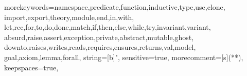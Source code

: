 
\newcommand{\todo}[1]{{\Huge\bfseries TODO: #1}}

\newcommand{\why}{\textsf{Why3}\xspace}
\newcommand{\whyml}{\textsf{WhyML}\xspace}
\newcommand{\eg}{\emph{e.g.}\xspace}
\newcommand{\ie}{\emph{i.e.}\xspace}

\newcommand{\emptyitem}{\begin{latexonly}~\end{latexonly}}

\newcommand{\keyword}[1]{\texttt{#1}}
\newcommand{\indextt}[1]{\index{#1@\protect\keyword{#1}}}
\newcommand{\indexttbs}[1]{\index{#1@\protect\keywordbs{#1}}}
\newif\ifspace
\newif\ifnewentry
\newcommand{\addspace}{\ifspace ~ \spacefalse \fi}
\newcommand{\term}[2]{\addspace\mbox{\lstinline|#1|%
\ifthenelse{\equal{#2}{}}{}{\indexttbase{#2}{#1}}}\spacetrue}
\newcommand{\nonterm}[2]{%
  \ifthenelse{\equal{#2}{}}%
             {\addspace\mbox{\textsl{#1}\ifnewentry\index{#1@\textsl{#1}}\fi}\spacetrue}%
             {\addspace\mbox{\textsl{#1}\footnote{#2}\ifnewentry\index{grammar entries!\textsl{#1}}\fi}\spacetrue}}
\newcommand{\repetstar}{$^*$\spacetrue}
\newcommand{\repetplus}{$^+$\spacetrue}
\newcommand{\repetone}{$^?$\spacetrue}
\newcommand{\lparen}{\addspace(}
\newcommand{\rparen}{)}
\newcommand{\orelse}{\addspace$\mid$\spacetrue}
\newcommand{\sep}{ \\[2mm] \spacefalse\newentrytrue}
\newcommand{\newl}{ \\ & & \spacefalse}
\newcommand{\alt}{ \\ & $\mid$ & \spacefalse}
\newcommand{\is}{ & $::=$ & \spacefalse\newentryfalse}
\newenvironment{syntax}{\begin{tabular}{@{}rrll@{}}\spacefalse\newentrytrue}{\end{tabular}}
\newcommand{\synt}[1]{$\spacefalse#1$}
\newcommand{\emptystring}{$\epsilon$}
\newcommand{\below}{See\; below}


\RequirePackage{listings}
\RequirePackage{amssymb}


{
morekeywords={namespace,predicate,function,inductive,type,use,clone,%
import,export,theory,module,end,in,with,%
let,rec,for,to,do,done,match,if,then,else,while,try,invariant,variant,%
absurd,raise,assert,exception,private,abstract,mutable,ghost,%
downto,raises,writes,reads,requires,ensures,returns,val,model,%
goal,axiom,lemma,forall},%
string=[b]",%
sensitive=true,%
morecomment=[s]{(*}{*)},%
keepspaces=true,
}


